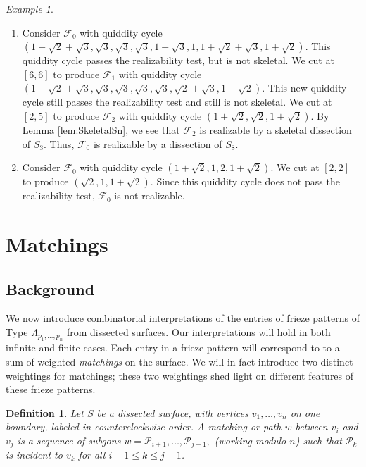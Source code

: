 \documentclass[12pt]{article}
\newtheorem{definition}{Definition}
\theoremstyle{remark}
\newtheorem{example}{Example}
\newcommand*{\poly}[1]{\mathcal{P}_{#1}}
\newcommand*{\F}{\mathcal{F}}
\begin{document}
\begin{example}
\begin{enumerate}
    \item Consider $\F_0$ with quiddity cycle  $(1+\sqrt{2}+\sqrt{3},\sqrt{3},\sqrt{3},\sqrt{3},1+ \sqrt{3},1,1 +\sqrt{2}+\sqrt{3}, 1+\sqrt{2}) $. This quiddity cycle passes the realizability test, but is not skeletal. We cut at $[6,6]$ to produce $\F_1$ with quiddity cycle  $(1+\sqrt{2}+\sqrt{3},\sqrt{3},\sqrt{3},\sqrt{3},\sqrt{3},\sqrt{2}+\sqrt{3}, 1+\sqrt{2})$. This new quiddity cycle still passes the realizability test and still is not skeletal. We cut at $[2,5]$ to produce $\F_2$ with quiddity cycle $(1 + \sqrt{2},\sqrt{2},1+\sqrt{2})$. By Lemma \ref{lem:SkeletalSn}, we see that $\F_2$ is realizable by a skeletal dissection of $S_3$. Thus, $\F_0$ is realizable by a dissection of $S_8$.
    \item Consider $\F_0$ with quiddity cycle $(1+\sqrt{2},1,2,1+\sqrt{2})$. We cut at $[2,2]$ to produce $(\sqrt{2},1,1+\sqrt{2})$. Since this quiddity cycle does not pass the realizability test, $\F_0$ is not realizable. 
\end{enumerate}
\end{example}


\section{Matchings}\label{sec:Match}

\subsection{Background}

We now introduce combinatorial interpretations of the entries of frieze patterns of Type $\Lambda_{p_1,\ldots,p_n}$ from dissected surfaces. Our interpretations will hold in both infinite and finite cases. Each entry in a frieze pattern will correspond to to a sum of weighted \emph{matchings} on the surface. We will in fact introduce two distinct weightings for matchings; these two weightings shed light on different features of these frieze patterns. 

\begin{definition}\label{def:Matching}
Let $S$ be a dissected surface, with vertices $v_1,\ldots, v_n$ on one boundary, labeled in counterclockwise order. A \emph{matching} or \emph{path} $w$ between $v_i$ and $v_j$ is a sequence of subgons $w = \poly{i+1},\ldots,\poly{j-1},$ (working modulo $n$) such that $\poly{k}$ is incident to $v_k$ for all $i+1 \leq k \leq j-1$.
\end{definition}
\end{document}
